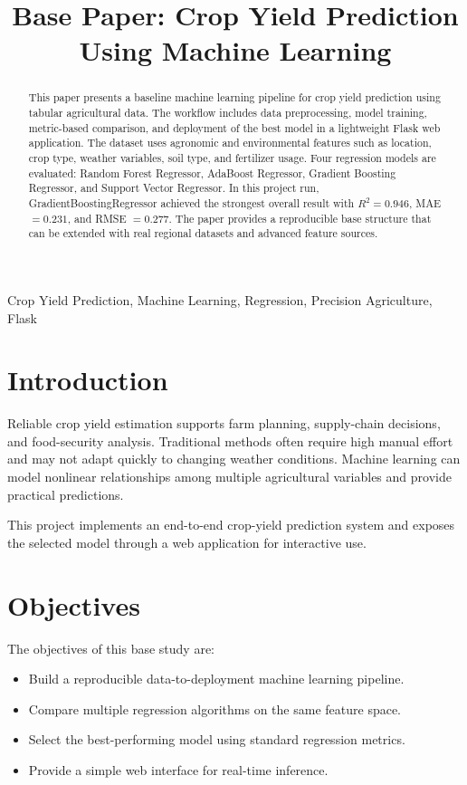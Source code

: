 \documentclass[conference]{IEEEtran}
\title{Base Paper: Crop Yield Prediction Using Machine Learning}
\author{%
\IEEEauthorblockN{Author Name}
\IEEEauthorblockA{Department Name\\
Institution Name\\
City, Country\\
email@domain.com}
}
\begin{document}
\maketitle

\begin{abstract}
This paper presents a baseline machine learning pipeline for crop yield prediction using tabular agricultural data. The workflow includes data preprocessing, model training, metric-based comparison, and deployment of the best model in a lightweight Flask web application. The dataset uses agronomic and environmental features such as location, crop type, weather variables, soil type, and fertilizer usage. Four regression models are evaluated: Random Forest Regressor, AdaBoost Regressor, Gradient Boosting Regressor, and Support Vector Regressor. In this project run, GradientBoostingRegressor achieved the strongest overall result with $R^2=0.946$, MAE $=0.231$, and RMSE $=0.277$. The paper provides a reproducible base structure that can be extended with real regional datasets and advanced feature sources.
\end{abstract}

\begin{IEEEkeywords}
Crop Yield Prediction, Machine Learning, Regression, Precision Agriculture, Flask
\end{IEEEkeywords}

\section{Introduction}
Reliable crop yield estimation supports farm planning, supply-chain decisions, and food-security analysis. Traditional methods often require high manual effort and may not adapt quickly to changing weather conditions. Machine learning can model nonlinear relationships among multiple agricultural variables and provide practical predictions.

This project implements an end-to-end crop-yield prediction system and exposes the selected model through a web application for interactive use.

\section{Objectives}
The objectives of this base study are:
\begin{itemize}
    \item Build a reproducible data-to-deployment machine learning pipeline.
    \item Compare multiple regression algorithms on the same feature space.
    \item Select the best-performing model using standard regression metrics.
    \item Provide a simple web interface for real-time inference.
\end{itemize}
\end{document}
